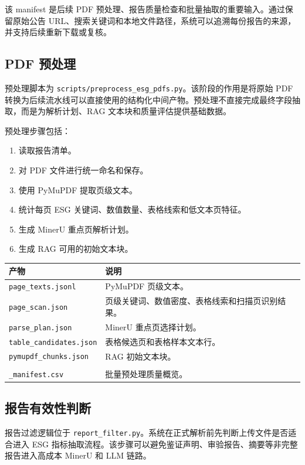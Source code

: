 \documentclass[UTF8,a4paper,12pt]{ctexart}
\newenvironment{manualtable}[1]{%
  \small
  \begin{longtable}{#1}
}{%
  \end{longtable}
  \normalsize
}
\begin{document}
该 manifest 是后续 PDF 预处理、报告质量检查和批量抽取的重要输入。通过保留原始公告 URL、搜索关键词和本地文件路径，系统可以追溯每份报告的来源，并支持后续重新下载或复核。

\subsection{PDF 预处理}

预处理脚本为 \texttt{scripts/preprocess\_esg\_pdfs.py}。该阶段的作用是将原始 PDF 转换为后续流水线可以直接使用的结构化中间产物。预处理不直接完成最终字段抽取，而是为解析计划、RAG 文本块和质量评估提供基础数据。

预处理步骤包括：

\begin{enumerate}
  \item 读取报告清单。
  \item 对 PDF 文件进行统一命名和保存。
  \item 使用 PyMuPDF 提取页级文本。
  \item 统计每页 ESG 关键词、数值数量、表格线索和低文本页特征。
  \item 生成 MinerU 重点页解析计划。
  \item 生成 RAG 可用的初始文本块。
\end{enumerate}

\begin{manualtable}{p{5cm}p{9cm}}
\toprule
\textbf{产物} & \textbf{说明} \\
\midrule
\endhead
\texttt{page\_texts.jsonl} & PyMuPDF 页级文本。 \\
\texttt{page\_scan.json} & 页级关键词、数值密度、表格线索和扫描页识别结果。 \\
\texttt{parse\_plan.json} & MinerU 重点页选择计划。 \\
\texttt{table\_candidates.json} & 表格候选页和表格样本文本行。 \\
\texttt{pymupdf\_chunks.json} & RAG 初始文本块。 \\
\makecell[l]{\texttt{preprocess}\\\texttt{\_manifest.csv}} & 批量预处理质量概览。 \\
\bottomrule
\end{manualtable}

\subsection{报告有效性判断}

报告过滤逻辑位于 \texttt{report\_filter.py}。系统在正式解析前先判断上传文件是否适合进入 ESG 指标抽取流程。该步骤可以避免鉴证声明、审验报告、摘要等非完整报告进入高成本 MinerU 和 LLM 链路。
\end{document}
